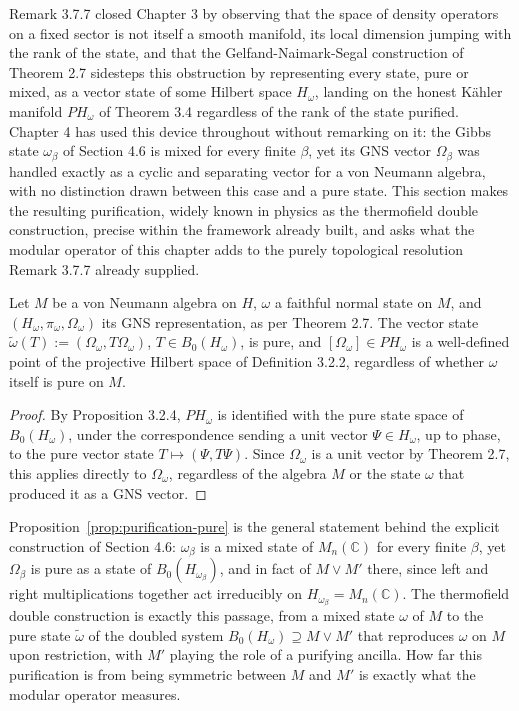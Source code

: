 Remark 3.7.7 closed Chapter 3 by observing that the space of density operators on a fixed sector is not itself a smooth manifold, its local dimension jumping with the rank of the state, and that the Gelfand-Naimark-Segal construction of Theorem 2.7 sidesteps this obstruction by representing every state, pure or mixed, as a vector state of some Hilbert space $H_\omega$, landing on the honest Kähler manifold $PH_\omega$ of Theorem 3.4 regardless of the rank of the state purified. Chapter 4 has used this device throughout without remarking on it: the Gibbs state $\omega_\beta$ of Section 4.6 is mixed for every finite $\beta$, yet its GNS vector $\Omega_\beta$ was handled exactly as a cyclic and separating vector for a von Neumann algebra, with no distinction drawn between this case and a pure state. This section makes the resulting purification, widely known in physics as the thermofield double construction, precise within the framework already built, and asks what the modular operator of this chapter adds to the purely topological resolution Remark 3.7.7 already supplied.

\begin{proposition}\label{prop:purification-pure}
	Let $M$ be a von Neumann algebra on $H$, $\omega$ a faithful normal state on $M$, and $(H_\omega,\pi_\omega,\Omega_\omega)$ its GNS representation, as per Theorem 2.7. The vector state $\tilde\omega(T) := (\Omega_\omega,T\Omega_\omega)$, $T \in B_0(H_\omega)$, is pure, and $[\Omega_\omega] \in PH_\omega$ is a well-defined point of the projective Hilbert space of Definition 3.2.2, regardless of whether $\omega$ itself is pure on $M$.
\end{proposition}

\begin{proof}
	By Proposition 3.2.4, $PH_\omega$ is identified with the pure state space of $B_0(H_\omega)$, under the correspondence sending a unit vector $\Psi \in H_\omega$, up to phase, to the pure vector state $T \mapsto (\Psi,T\Psi)$. Since $\Omega_\omega$ is a unit vector by Theorem 2.7, this applies directly to $\Omega_\omega$, regardless of the algebra $M$ or the state $\omega$ that produced it as a GNS vector.
\end{proof}

Proposition~\ref{prop:purification-pure} is the general statement behind the explicit construction of Section 4.6: $\omega_\beta$ is a mixed state of $M_n(\mathbb{C})$ for every finite $\beta$, yet $\Omega_\beta$ is pure as a state of $B_0(H_{\omega_\beta})$, and in fact of $M \vee M'$ there, since left and right multiplications together act irreducibly on $H_{\omega_\beta} = M_n(\mathbb{C})$. The thermofield double construction is exactly this passage, from a mixed state $\omega$ of $M$ to the pure state $\tilde\omega$ of the doubled system $B_0(H_\omega) \supseteq M \vee M'$ that reproduces $\omega$ on $M$ upon restriction, with $M'$ playing the role of a purifying ancilla. How far this purification is from being symmetric between $M$ and $M'$ is exactly what the modular operator measures.


